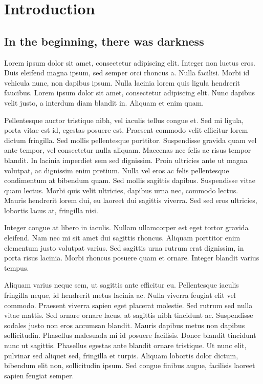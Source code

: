 \chapter{Introduction}

\section{In the beginning, there was darkness}

Lorem ipsum dolor sit amet, consectetur adipiscing elit. Integer non luctus eros. Duis eleifend magna ipsum, sed semper orci rhoncus a. Nulla facilisi. Morbi id vehicula nunc, non dapibus ipsum. Nulla lacinia lorem quis ligula hendrerit faucibus. Lorem ipsum dolor sit amet, consectetur adipiscing elit. Nunc dapibus velit justo, a interdum diam blandit in. Aliquam et enim quam.

Pellentesque auctor tristique nibh, vel iaculis tellus congue et. Sed mi ligula, porta vitae est id, egestas posuere est. Praesent commodo velit efficitur lorem dictum fringilla. Sed mollis pellentesque porttitor. Suspendisse gravida quam vel ante tempor, vel consectetur nulla aliquam. Maecenas nec felis ac risus tempor blandit. In lacinia imperdiet sem sed dignissim. Proin ultricies ante ut magna volutpat, ac dignissim enim pretium. Nulla vel eros ac felis pellentesque condimentum at bibendum quam. Sed mollis sagittis dapibus. Suspendisse vitae quam lectus. Morbi quis velit ultricies, dapibus urna nec, commodo lectus. Mauris hendrerit lorem dui, eu laoreet dui sagittis viverra. Sed sed eros ultricies, lobortis lacus at, fringilla nisi.

Integer congue at libero in iaculis. Nullam ullamcorper est eget tortor gravida eleifend. Nam nec mi sit amet dui sagittis rhoncus. Aliquam porttitor enim elementum justo volutpat varius. Sed sagittis urna rutrum erat dignissim, in porta risus lacinia. Morbi rhoncus posuere quam et ornare. Integer blandit varius tempus.

Aliquam varius neque sem, ut sagittis ante efficitur eu. Pellentesque iaculis fringilla neque, id hendrerit metus lacinia ac. Nulla viverra feugiat elit vel commodo. Praesent viverra sapien eget placerat molestie. Sed rutrum sed nulla vitae mattis. Sed ornare ornare lacus, at sagittis nibh tincidunt ac. Suspendisse sodales justo non eros accumsan blandit. Mauris dapibus metus non dapibus sollicitudin. Phasellus malesuada mi id posuere facilisis. Donec blandit tincidunt nunc ut sagittis. Phasellus egestas ante blandit ornare tristique. Ut nunc elit, pulvinar sed aliquet sed, fringilla et turpis. Aliquam lobortis dolor dictum, bibendum elit non, sollicitudin ipsum. Sed congue finibus augue, facilisis laoreet sapien feugiat semper.

